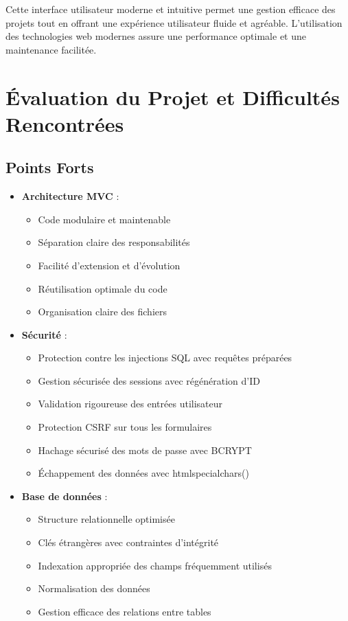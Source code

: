 \documentclass[12pt,a4paper]{article}
\begin{document}
Cette interface utilisateur moderne et intuitive permet une gestion efficace des projets tout en offrant une expérience utilisateur fluide et agréable. L'utilisation des technologies web modernes assure une performance optimale et une maintenance facilitée.

\section{Évaluation du Projet et Difficultés Rencontrées}
\subsection{Points Forts}
\begin{itemize}
    \item \textbf{Architecture MVC} :
    \begin{itemize}
        \item Code modulaire et maintenable
        \item Séparation claire des responsabilités
        \item Facilité d'extension et d'évolution
        \item Réutilisation optimale du code
        \item Organisation claire des fichiers
    \end{itemize}

    \item \textbf{Sécurité} :
    \begin{itemize}
        \item Protection contre les injections SQL avec requêtes préparées
        \item Gestion sécurisée des sessions avec régénération d'ID
        \item Validation rigoureuse des entrées utilisateur
        \item Protection CSRF sur tous les formulaires
        \item Hachage sécurisé des mots de passe avec BCRYPT
        \item Échappement des données avec htmlspecialchars()
    \end{itemize}

    \item \textbf{Base de données} :
    \begin{itemize}
        \item Structure relationnelle optimisée
        \item Clés étrangères avec contraintes d'intégrité
        \item Indexation appropriée des champs fréquemment utilisés
        \item Normalisation des données
        \item Gestion efficace des relations entre tables
    \end{itemize}


\end{itemize}
\end{document}
